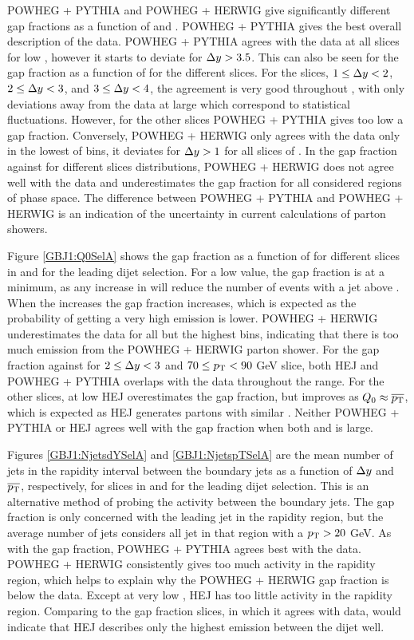 POWHEG + PYTHIA and POWHEG + HERWIG give significantly different gap fractions as a function of \dy{} and \ptb{}.
POWHEG + PYTHIA gives the best overall description of the data.
POWHEG + PYTHIA agrees with the data at all \ptb{} slices for low \dy{}, however it starts to deviate for $\mbox{$\Delta y$}{}>3.5$. 
This can also be seen for the gap fraction as a function of \ptb{} for the different \dy{} slices. 
For the slices, $1\le\mbox{$\Delta y$}{}<2$, $2\le\mbox{$\Delta y$}{}<3$, and $3\le\mbox{$\Delta y$}{}<4$, the agreement is very good throughout \ptb{}, with only deviations away from the data at large \dy{} which correspond to statistical fluctuations.
However, for the other \dy{} slices POWHEG + PYTHIA gives too low a gap fraction.
Conversely, POWHEG + HERWIG only agrees with the data only in the lowest of \dy{} bins, it deviates for $\mbox{$\Delta y$}{}>1$ for all slices of \ptb{}. 
In the gap fraction against \ptb{} for different \dy{} slices distributions, POWHEG + HERWIG does not agree well with the data and underestimates the gap fraction for all considered regions of phase space.
The difference between POWHEG + PYTHIA and POWHEG + HERWIG is an indication of the uncertainty in current calculations of parton showers.


Figure \ref{GBJ1:Q0SelA} shows the gap fraction as a function of \qz{} for different slices in \dy{} and \ptb{} for the leading \pt{} dijet selection.
For a low \qz{} value, the gap fraction is at a minimum, as any increase in \qz{} will reduce the number of events with a jet above \qz{}.
When the \qz{} increases the gap fraction increases, which is expected as the probability of getting a very high \pt{} emission is lower.
POWHEG + HERWIG underestimates the data for all but the highest \qz{} bins, indicating that there is too much emission from the POWHEG + HERWIG parton shower. 
For the gap fraction against \qz{} for $2\le\mbox{$\Delta y$}{}<3$ and  $70\le\mbox{$p_{\rm T}$}{}<90$ GeV slice, both HEJ and POWHEG + PYTHIA overlaps with the data throughout the \qz{} range. 
For the other slices, at low \qz{} HEJ overestimates the gap fraction, but improves as $\mbox{$Q_0$}{}\approx\mbox{$\overline{p_{\rm T}}$}{}$, which is expected as HEJ generates partons with similar \pt{}.
Neither POWHEG + PYTHIA or HEJ agrees well with the gap fraction when both \dy{} and \qz{} is large.



Figures \ref{GBJ1:NjetsdYSelA} and \ref{GBJ1:NjetspTSelA} are the mean number of jets in the rapidity interval between the boundary jets as a function of $\mbox{$\Delta y$}{}$ and $\mbox{$\overline{p_{\rm T}}$}{}$, respectively, for slices in \ptb{} and \dy{} for the leading \pt{} dijet selection. 
This is an alternative method of probing the activity between the boundary jets. 
The gap fraction is only concerned with the leading jet in the rapidity region, but the average number of jets considers all jet in that region with a $\mbox{$p_{\rm T}$}{}>20$ GeV. 
As with the gap fraction, POWHEG + PYTHIA agrees best with the data.
POWHEG + HERWIG consistently gives too much activity in the rapidity region, which helps to explain why the POWHEG + HERWIG gap fraction is below the data.
Except at very low \ptb{}, HEJ has too little activity in the rapidity region.
Comparing to the gap fraction slices, in which it agrees with data, would indicate that HEJ describes only the highest \pt{} emission between the dijet well. 

